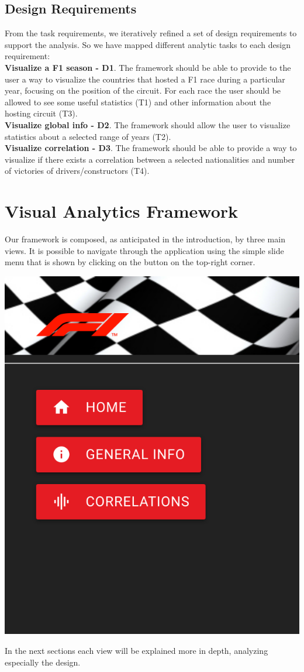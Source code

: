 \documentclass[11pt,twocolumn,letterpaper]{article}
\begin{document}
\subsection{Design Requirements}
From the task requirements, we iteratively refined a set of design requirements to support the analysis. So we have mapped different analytic tasks to each design requirement:\\
\textbf{Visualize a F1 season - D1}. The framework should be able to provide to the user a way to visualize the countries that hosted a F1 race during a particular year, focusing on the position of the circuit. For each race the user should be allowed to see some useful statistics (T1) and other information about the hosting circuit (T3).\\
\textbf{Visualize global info - D2}. The framework should allow the user to visualize statistics about a selected range of years (T2).\\
\textbf{Visualize correlation - D3}. The framework should be able to provide a way to visualize if there exists a correlation between a selected nationalities and number of victories of drivers/constructors (T4).

\section{Visual Analytics Framework}
Our framework is composed, as anticipated in the introduction, by three main views. It is possible to navigate through the application using the simple slide menu that is shown by clicking on the button on the top-right corner.
\begin{center}
	\centering
	\includegraphics[width=0.3\columnwidth]{menu}
\end{center}
In the next sections each view will be explained more in depth, analyzing especially the design.
\end{document}
